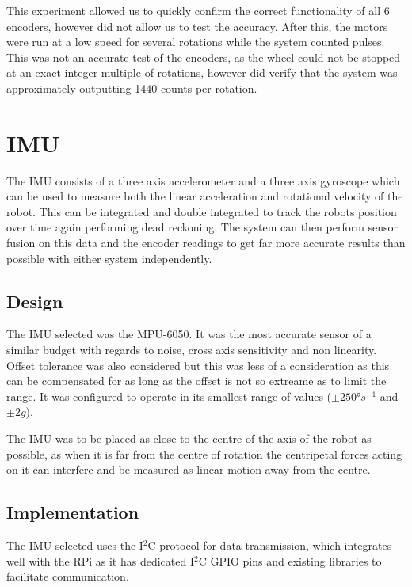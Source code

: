 This experiment allowed us to quickly confirm the correct functionality of 
all 6 encoders, however did not allow us to test the accuracy. After this, 
the motors were run at a low speed for several rotations while the system counted pulses. This was not an accurate test of the encoders, as the wheel could not be stopped at an exact integer multiple of rotations, however did verify that the system was approximately outputting 1440 counts per rotation. 

\section{IMU}\label{elec/imu}
The IMU consists of a three axis accelerometer and a three axis gyroscope which can be used to measure both the linear acceleration and rotational velocity of the robot. This can be integrated and double integrated to track the robots position over time again performing dead reckoning. The system can then perform sensor fusion on this data and the encoder readings to get far more accurate results than possible with either system independently. 

\subsection{Design}\label{elec/imu/design}
The IMU selected was the MPU-6050. It was the most accurate sensor of a similar budget with regards to noise, cross axis sensitivity and non linearity. Offset tolerance was also considered but this was less of a consideration as this can be compensated for as long as the offset is not so extreame as to limit the range. It was configured to operate in its smallest range of values ($\pm\ang{250}s^{-1}$ and $\pm2g$\cite{}).

The IMU was to be placed as close to the centre of the axis of the robot as possible, as when it is far from the centre of rotation the centripetal forces acting on it can interfere and be measured as linear motion away from the centre.  

\subsection{Implementation}\label{elec/imu/impl}

The IMU selected uses the I$^2$C protocol for data transmission, which integrates well with the RPi as it has dedicated I$^2$C GPIO pins and existing libraries to facilitate communication. 

